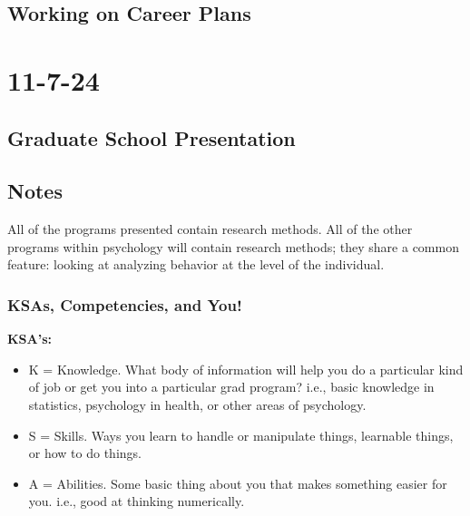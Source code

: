 \documentclass{report}
\begin{document}
\subsection{Working on Career Plans}

\section{11-7-24}
\subsection{Graduate School Presentation}
\subsection{Notes}
All of the programs presented contain research methods. 
All of the other programs within psychology will contain research methods; they share a common feature: looking at analyzing behavior at the level of the individual.

\subsubsection{KSAs, Competencies, and You!}

\textbf{KSA's:} 

\begin{itemize}
    \item K = Knowledge. What body of information will help you do a particular kind of job or get you into a particular grad program? i.e., basic knowledge in statistics, psychology in health, or other areas of psychology. 
    \item S = Skills. Ways you learn to handle or manipulate things, learnable things, or how to do things. 
    \item A = Abilities. Some basic thing about you that makes something easier for you. i.e., good at thinking numerically.
\end{itemize}
\end{document}
